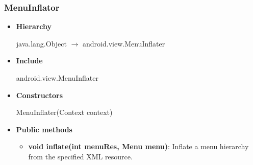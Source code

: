 \documentclass{report}
\begin{document}
\begin{itemize}
    \pagebreak 
    \subsubsection{MenuInflator}
    \begin{itemize}
        \item \textbf{Hierarchy}
            \begin{center}
                java.lang.Object $\to$	android.view.MenuInflater
            \end{center}
        \item \textbf{Include}
            \bigbreak \noindent 
            \begin{javacode}
                android.view.MenuInflater
            \end{javacode}
        \item \textbf{Constructors}
            \bigbreak \noindent 
            \begin{javacode}
                MenuInflater(Context context) 
            \end{javacode}
        \item \textbf{Public methods}
            \begin{itemize}
                \item \textbf{void	inflate(int menuRes, Menu menu)}: Inflate a menu hierarchy from the specified XML resource.
            \end{itemize}
    \end{itemize}

    \pagebreak 

\end{itemize}
\end{document}
